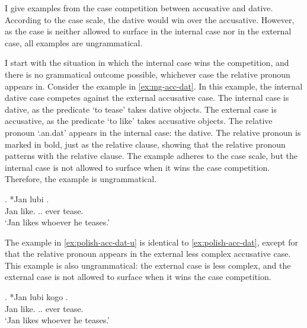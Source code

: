 I give examples from the case competition between accusative and dative. According to the case scale, the dative would win over the accusative. However, as the case is neither allowed to surface in the internal case nor in the external case, all examples are ungrammatical.

I start with the situation in which the internal case wins the competition, and there is no grammatical outcome possible, whichever case the relative pronoun appears in.
Consider the example in \ref{ex:mg-acc-dat}. In this example, the internal dative case competes against the external accusative case.
The internal case is dative, as the predicate  `to tease' takes dative objects.
The external case is accusative, as the predicate  `to like' takes accusative objects.
The relative pronoun  `.\ac{an}.\ac{dat}' appears in the internal case: the dative. The relative pronoun is marked in bold, just as the relative clause, showing that the relative pronoun patterns with the relative clause.
The example adheres to the case scale, but the internal case is not allowed to surface when it wins the case competition. Therefore, the example is ungrammatical.

\exg. *Jan lubi   .\\
Jan like.\scsub{[acc]} .. ever tease.\scsub{[dat]}\\
`Jan likes whoever he teases.' \label{ex:polish-acc-dat}

The example in \ref{ex:polish-acc-dat-u} is identical to \ref{ex:polish-acc-dat}, except for that the relative pronoun appears in the external less complex accusative case. This example is also ungrammatical: the external case is less complex, and the external case is not allowed to surface when it wins the case competition.

\exg. *Jan lubi kogo  .\\
Jan like.\scsub{[acc]} .. ever tease.\scsub{[dat]}\\
`Jan likes whoever he teases.' \label{ex:polish-acc-dat-u}

